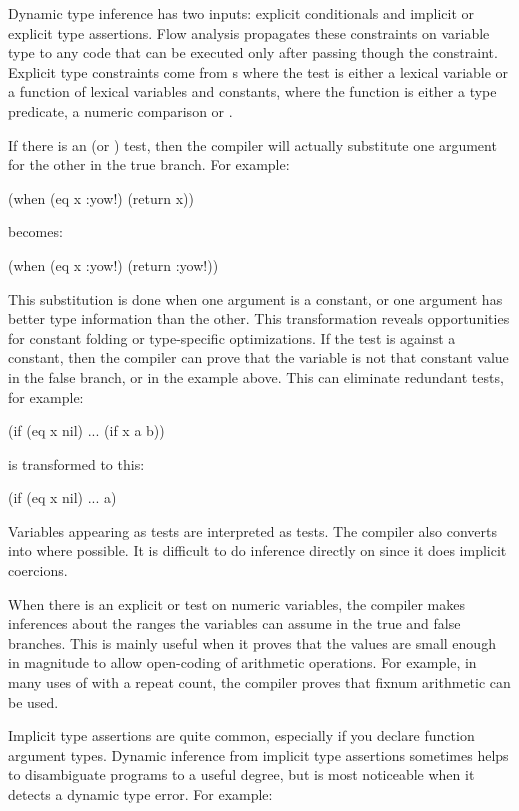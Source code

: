 Dynamic type inference has two inputs: explicit conditionals and
implicit or explicit type assertions.  Flow analysis propagates these
constraints on variable type to any code that can be executed only
after passing though the constraint.  Explicit type constraints come
from s where the test is either a lexical variable or a
function of lexical variables and constants, where the function is
either a type predicate, a numeric comparison or .

If there is an  (or ) test, then the compiler will
actually substitute one argument for the other in the true branch.
For example:
\begin{lisp}
(when (eq x :yow!) (return x))
\end{lisp}
becomes:
\begin{lisp}
(when (eq x :yow!) (return :yow!))
\end{lisp}
This substitution is done when one argument is a constant, or one
argument has better type information than the other.  This
transformation reveals opportunities for constant folding or
type-specific optimizations.  If the test is against a constant, then
the compiler can prove that the variable is not that constant value in
the false branch, or   in the example
above.  This can eliminate redundant tests, for example:
\begin{example}
(if (eq x nil)
    ...
    (if x a b))
\end{example}
is transformed to this:
\begin{example}
(if (eq x nil)
    ...
    a)
\end{example}
Variables appearing as  tests are interpreted as
 tests.  The compiler also converts
\code{=} into  where possible.  It is difficult to do
inference directly on \code{=} since it does implicit coercions.

When there is an explicit \code{\textless} or \code{\textgreater} test on numeric
variables, the compiler makes inferences about the ranges the
variables can assume in the true and false branches. This is mainly
useful when it proves that the values are small enough in magnitude to
allow open-coding of arithmetic operations. For example, in many uses
of  with a  repeat count, the compiler
proves that fixnum arithmetic can be used.

Implicit type assertions are quite common, especially if you declare
function argument types.  Dynamic inference from implicit type
assertions sometimes helps to disambiguate programs to a useful
degree, but is most noticeable when it detects a dynamic type error.
For example:

